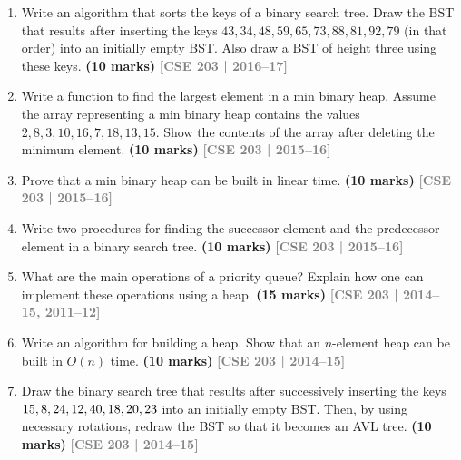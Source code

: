 \documentclass[12pt,a3paper]{article}
\newcommand{\yr}[1]{\hfill\textcolor{gray}{\small\textbf{[#1]}}}
\newcommand{\mk}[1]{\textcolor{orange!70!black}{\small\textbf{(#1 marks)}}}
\begin{document}
\begin{enumerate}
\item Write an algorithm that sorts the keys of a binary search tree. Draw the BST that results after inserting the keys $43, 34, 48, 59, 65, 73, 88, 81, 92, 79$ (in that order) into an initially empty BST. Also draw a BST of height three using these keys. \mk{10}
\yr{CSE 203 | 2016--17}

\item Write a function to find the largest element in a min binary heap. Assume the array representing a min binary heap contains the values $2, 8, 3, 10, 16, 7, 18, 13, 15$. Show the contents of the array after deleting the minimum element. \mk{10}
\yr{CSE 203 | 2015--16}

\item Prove that a min binary heap can be built in linear time. \mk{10}
\yr{CSE 203 | 2015--16}

\item Write two procedures for finding the successor element and the predecessor element in a binary search tree. \mk{10}
\yr{CSE 203 | 2015--16}

\item What are the main operations of a priority queue? Explain how one can implement these operations using a heap. \mk{15}
\yr{CSE 203 | 2014--15, 2011--12}

\item Write an algorithm for building a heap. Show that an $n$-element heap can be built in $O(n)$ time. \mk{10}
\yr{CSE 203 | 2014--15}

\item Draw the binary search tree that results after successively inserting the keys $15, 8, 24,\\ 12, 40, 18, 20, 23$ into an initially empty BST. Then, by using necessary rotations, redraw the BST so that it becomes an AVL tree. \mk{10}
\yr{CSE 203 | 2014--15}


\end{enumerate}
\end{document}
